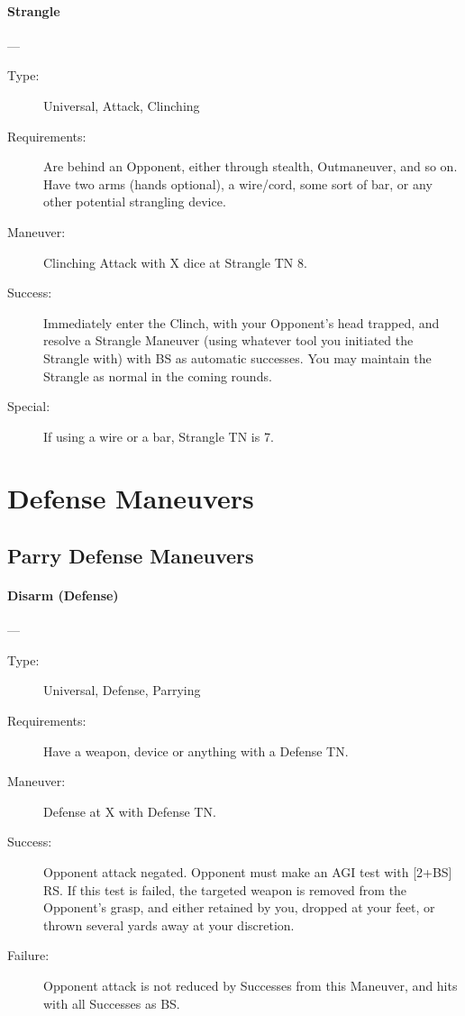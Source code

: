 \documentclass[oneside,11pt,english]{book}
\begin{document}
\paragraph{\large\label{man:Strangle}Strangle}---\quad{\large[X]}
\vspace{-10pt}\begin{description} 
\item [Type:] Universal, Attack, Clinching 
\item [Requirements:] Are behind an Opponent, either through stealth, Outmaneuver, and so on. Have two arms 
(hands optional), a wire/cord, some sort of bar, or any other potential strangling device. 
\item [Maneuver:] Clinching Attack with X dice at Strangle TN 8. 
\item [Success:] Immediately enter the Clinch, with your Opponent’s head trapped, and resolve a Strangle 
Maneuver (using whatever tool you initiated the Strangle with) with BS as automatic successes. You may 
maintain the Strangle as normal in the coming rounds. 
\item [Special:] If using a wire or a bar, Strangle TN is 7.
\end{description}

\section{Defense Maneuvers}
\subsection{Parry Defense Maneuvers}
\paragraph{\large\label{man:Disarm (Defense)}Disarm (Defense)}---\quad{\large[X+2]}
\vspace{-10pt}\begin{description} 
\item [Type:] Universal, Defense, Parrying
\item [Requirements:] Have a weapon, device or anything with a Defense TN. 
\item [Maneuver:] Defense at X with Defense TN. 
\item [Success:] Opponent attack negated. Opponent must make an AGI test with [2+BS] RS. If this test is failed, 
the targeted weapon is removed from the Opponent's grasp, and either retained by you, dropped at your 
feet, or thrown several yards away at your discretion. 
\item [Failure:] Opponent attack is not reduced by Successes from this Maneuver, and hits with all Successes as BS.
\end{description}
\end{document}

